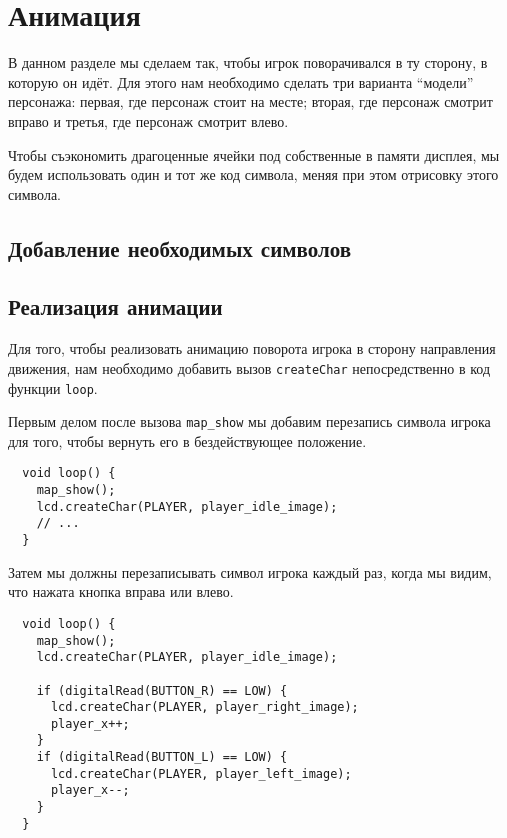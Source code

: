 \documentclass[../sparc.tex]{subfiles}
\begin{document}
\section{Анимация}

В данном разделе мы сделаем так, чтобы игрок поворачивался в ту сторону, в
которую он идёт.  Для этого нам необходимо сделать три варианта ``модели''
персонажа: первая, где персонаж стоит на месте; вторая, где персонаж смотрит
вправо и третья, где персонаж смотрит влево.

Чтобы съэкономить драгоценные ячейки под собственные в памяти дисплея, мы будем
использовать один и тот же код символа, меняя при этом отрисовку этого символа.

\subsection{Добавление необходимых символов}



\subsection{Реализация анимации}

Для того, чтобы реализовать анимацию поворота игрока в сторону направления
движения, нам необходимо добавить вызов \texttt{createChar} непосредственно в
код функции \texttt{loop}.

Первым делом после вызова \texttt{map\_show} мы добавим перезапись символа игрока
для того, чтобы вернуть его в бездействующее положение.

\begin{verbatim}
  void loop() {
    map_show();
    lcd.createChar(PLAYER, player_idle_image);
    // ...
  }
\end{verbatim}

Затем мы должны перезаписывать символ игрока каждый раз, когда мы видим, что
нажата кнопка вправа или влево.

\begin{verbatim}
  void loop() {
    map_show();
    lcd.createChar(PLAYER, player_idle_image);

    if (digitalRead(BUTTON_R) == LOW) {
      lcd.createChar(PLAYER, player_right_image);
      player_x++;
    }
    if (digitalRead(BUTTON_L) == LOW) {
      lcd.createChar(PLAYER, player_left_image);
      player_x--;
    }
  }
\end{verbatim}
\end{document}
